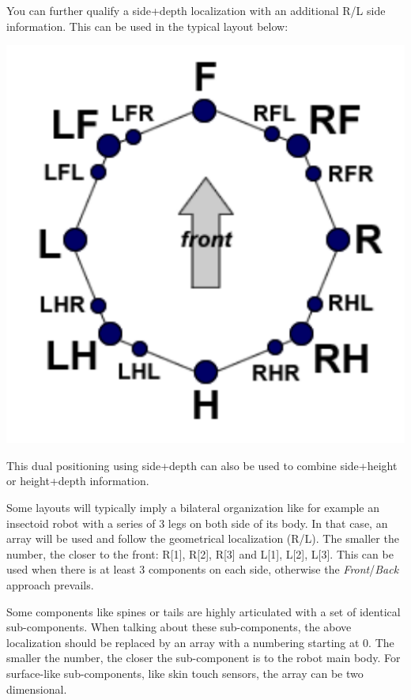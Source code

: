 You can further qualify a side+depth localization with an additional
R/L side information. This can be used in the typical layout below:

\begin{center}
  \includegraphics{img/lrfh}
\end{center}

This dual positioning using side+depth can also be used to combine
side+height or height+depth information.

Some layouts will typically imply a bilateral organization like for
example an insectoid robot with a series of 3 legs on both side of its
body. In that case, an array will be used and follow the geometrical
localization (R/L). The smaller the number, the closer to the front:
R[1], R[2], R[3] and L[1], L[2], L[3]. This can be used when there is
at least 3 components on each side, otherwise the
\textit{Front}/\textit{Back} approach prevails.

Some components like spines or tails are highly articulated with a set
of identical sub-components. When talking about these sub-components,
the above localization should be replaced by an array with a numbering
starting at 0. The smaller the number, the closer the sub-component is
to the robot main body. For surface-like sub-components, like skin
touch sensors, the array can be two dimensional.

